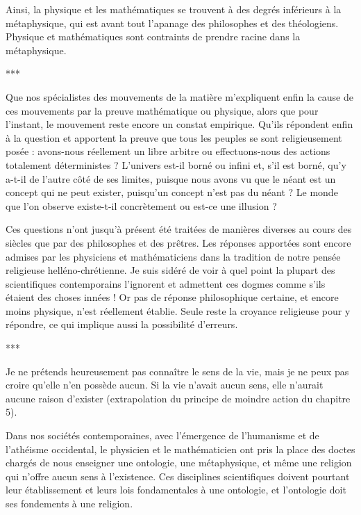 Ainsi, la physique et les mathématiques se trouvent à des degrés inférieurs à la métaphysique, qui est avant tout l'apanage des philosophes et des théologiens. Physique et mathématiques sont contraints de prendre racine dans la métaphysique.

\begin{center}
***
\end{center}

Que nos spécialistes des mouvements de la matière m'expliquent enfin la cause de ces mouvements par la preuve mathématique ou physique, alors que pour l'instant, le mouvement reste encore un constat empirique. Qu'ils répondent enfin à la question et apportent la preuve que tous les peuples se sont religieusement posée : avons-nous réellement un libre arbitre ou effectuons-nous des actions totalement déterministes ? L'univers est-il borné ou infini et, s'il est borné, qu'y a-t-il de l'autre côté de ses limites, puisque nous avons vu que le néant est un concept qui ne peut exister, puisqu'un concept n'est pas du néant ? Le monde que l'on observe existe-t-il concrètement ou est-ce une illusion ?

Ces questions n'ont jusqu'à présent été traitées de manières diverses au cours des siècles que par des philosophes et des prêtres. Les réponses apportées sont encore admises par les physiciens et mathématiciens dans la tradition de notre pensée religieuse helléno-chrétienne. Je suis sidéré de voir à quel point la plupart des scientifiques contemporains l'ignorent et admettent ces dogmes comme s'ils étaient des choses innées ! Or pas de réponse philosophique certaine, et encore moins physique, n'est réellement établie. Seule reste la croyance religieuse pour y répondre, ce qui implique aussi la possibilité d'erreurs.

\begin{center}
***
\end{center} 

Je ne prétends heureusement pas connaître le sens de la vie, mais je ne peux pas croire qu'elle n'en possède aucun. Si la vie n'avait aucun sens, elle n'aurait aucune raison d'exister (extrapolation du principe de moindre action du chapitre 5).

Dans nos sociétés contemporaines, avec l'émergence de l'humanisme et de l'athéisme occidental, le physicien et le mathématicien ont pris la place des doctes chargés de nous enseigner une ontologie, une métaphysique, et même une religion qui n'offre aucun sens à l'existence. Ces disciplines scientifiques doivent pourtant leur établissement et leurs lois fondamentales à une ontologie, et l'ontologie doit ses fondements à une religion.

